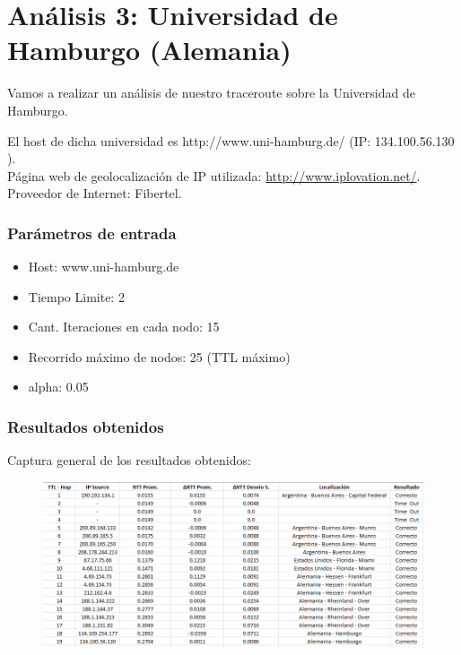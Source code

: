 \section{An\'alisis 3: Universidad de Hamburgo (Alemania)}
Vamos a realizar un an\'alisis de nuestro traceroute sobre la Universidad de Hamburgo.

El host de dicha universidad es http://www.uni-hamburg.de/ (IP: 134.100.56.130 ).\\	

Página web de geolocalización de IP utilizada: \url{http://www.iplovation.net/}.\\

Proveedor de Internet: Fibertel.

\subsubsection{Par\'ametros de entrada}
\begin{itemize}
\item Host: www.uni-hamburg.de
\item Tiempo Limite: 2
\item Cant. Iteraciones en cada nodo: 15
\item Recorrido m\'aximo de nodos: 25 (TTL m\'aximo)
\item alpha: 0.05
\end{itemize}

\subsubsection{Resultados obtenidos}

Captura general de los resultados obtenidos: 

\begin{figure}[h]
	\begin{center}
    \includegraphics[width=1\textwidth]{img_analisis3/captura.png} 
	\end{center} 
\end{figure}
\vspace{0.25cm}

